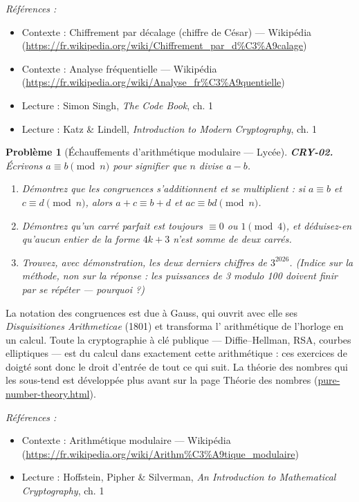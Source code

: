 \documentclass[11pt]{article}
\newtheorem{problem}{Problème}
\newenvironment{refs}{\par\small\noindent\emph{Références :}\begin{itemize}\setlength\itemsep{0pt}}{\end{itemize}\normalsize}
\begin{document}
\begin{refs}
\item Contexte : Chiffrement par décalage (chiffre de César) --- Wikipédia (\url{https://fr.wikipedia.org/wiki/Chiffrement_par_d%C3%A9calage})
\item Contexte : Analyse fréquentielle --- Wikipédia (\url{https://fr.wikipedia.org/wiki/Analyse_fr%C3%A9quentielle})
\item Lecture : Simon Singh, \textit{The Code Book}, ch. 1
\item Lecture : Katz \& Lindell, \textit{Introduction to Modern Cryptography}, ch. 1
\end{refs}

\bigskip

\begin{problem}[{Échauffements d'arithmétique modulaire --- Lycée}]
\textbf{CRY-02.} Écrivons $a \equiv b \pmod{n}$ pour signifier que
$n$ divise $a-b$.
\begin{enumerate}
\item[(a)] Démontrez que les congruences s'additionnent et se multiplient : si
$a \equiv b$ et $c \equiv d \pmod{n}$, alors $a+c \equiv b+d$ et
$ac \equiv bd \pmod{n}$.
\item[(b)] Démontrez qu'un carré parfait est toujours $\equiv 0$
ou $1 \pmod 4$, et déduisez-en qu'aucun entier de la forme $4k+3$ n'est somme de deux
carrés.
\item[(c)] Trouvez, avec démonstration, les deux derniers chiffres de $3^{2026}$. (Indice sur la
méthode, non sur la réponse : les puissances de 3 modulo 100 doivent finir par se répéter ---
pourquoi ?)
\end{enumerate}

\end{problem}

\noindent La notation des congruences est due à Gauss, qui ouvrit avec elle ses
\textit{Disquisitiones Arithmeticae} (1801) et transforma l'\og{} arithmétique de l'horloge \fg{} en
un calcul. Toute la cryptographie à clé publique --- Diffie--Hellman, RSA, courbes elliptiques ---
est du calcul dans exactement cette arithmétique : ces exercices de doigté sont donc le droit
d'entrée de tout ce qui suit. La théorie des nombres qui les sous-tend est développée plus
avant sur la page Théorie des nombres (\url{pure-number-theory.html}).

\begin{refs}
\item Contexte : Arithmétique modulaire --- Wikipédia (\url{https://fr.wikipedia.org/wiki/Arithm%C3%A9tique_modulaire})
\item Lecture : Hoffstein, Pipher \& Silverman, \textit{An Introduction to Mathematical Cryptography}, ch. 1
\end{refs}
\end{document}
